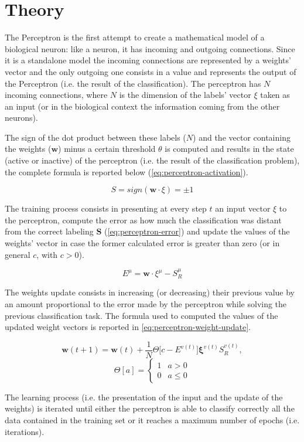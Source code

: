 \section{Theory}
\label{sec:fundamentals}
The Perceptron is the first attempt to create a mathematical model of a biological neuron:
like a neuron, it has incoming and outgoing connections.
Since it is a standalone model the incoming connections are represented by a weights' vector and the only outgoing one consists in a value and represents the output of the Perceptron (i.e. the result of the classification).
The perceptron has $N$ incoming connections, where $N$ is the dimension of the labels' vector $\xi$ taken as an input (or in the biological context the information coming from the other neurons).

The sign of the dot product between these labels ($N$) and the vector containing the weights ($\mathsf{\bm{w}}$) minus a certain threshold $\theta$ is computed and results in the state (active or inactive) of the perceptron (i.e. the result of the classification problem), the complete formula is reported below (\cref{eq:perceptron-activation}).

\begin{equation}
    S = sign(\mathsf{\bm{w}} \cdotp \xi) = \pm 1
    \label{eq:perceptron-activation}
\end{equation}

The training process consists in presenting at every step $t$ an input vector $\xi$ to the perceptron, compute the error as how much the classification was distant from the correct labeling $\bm{S}$ (\cref{eq:perceptron-error}) and update the values of the weights' vector in case the former calculated error is greater than zero (or in general $c$, with $c > 0$).

\begin{equation}
    \label{eq:perceptron-error}
    E^\mu = \mathsf{\bm{w}} \cdotp \xi^\mu - S^\mu_R
\end{equation}

The weights update consists in increasing (or decreasing) their previous value by an amount proportional to the error made by the perceptron while solving the previous classification task.
The formula used to computed the values of the updated weight vectors is reported in \cref{eq:perceptron-weight-update}.

\begin{equation}
    \label{eq:perceptron-weight-update}
    \mathsf{\bm{w}}(t+1) = \mathsf{\bm{w}}(t) + \frac{1}{N} \Theta \big[c - E^{v(t)}\big] \bm{\xi}^{v(t)} S^{v(t)}_R,     
\end{equation}
\[ \Theta[a] =  \begin{cases} 
    1 & a > 0 \\
    0 & a \leq 0 
\end{cases}
\]

The learning process (i.e. the presentation of the input and the update of the weights) is iterated until either the perceptron is able to classify correctly all the data contained in the training set or it reaches a maximum number of epochs (i.e. iterations).

